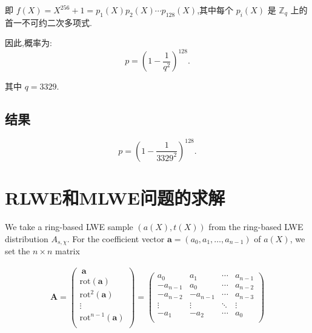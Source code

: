 \documentclass[12pt,a4paper]{article}
\numberwithin{equation}{section}
\begin{document}
即 $f(X) = X^{256} + 1 = p_1(X) p_2(X) \cdots p_{128}(X)$,其中每个 $p_i(X)$ 是 $\mathbb{Z}_q$ 上的首一不可约二次多项式.

因此,概率为:
\begin{equation}
	p = \left(1 - \frac{1}{q^2}\right)^{128}.
\end{equation}


其中 $q = 3329$.



\subsection{结果}

\begin{equation}
	p = \left(1 - \frac{1}{3329^2}\right)^{128}.
\end{equation}



\section{RLWE和MLWE问题的求解}

We take a ring-based LWE sample $(a(X), t(X))$ from the ring-based LWE distribution $A_{s,\chi}$. 
For the coefficient vector $\mathbf{a} = (a_0, a_1, \ldots , a_{n-1})$ of $a(X)$, we set the $n \times n$ matrix

\begin{align}
    \mathbf{A} = \left( \begin{matrix}
        \ \mathbf{a} \\ \mathrm{rot}(\mathbf{a}) \\ \mathrm{rot}^2(\mathbf{a}) \\ \vdots \\ \mathrm{rot}^{n-1}(\mathbf{a}) \\
    \end{matrix} \right) 
    = 
    \left( \begin{matrix}
        a_0 &a_1& \cdots& a_{n-1}\\ 
        -a_{n-1} &a_0& \cdots& a_{n-2}\\ 
        -a_{n-2} &-a_{n-1}& \cdots& a_{n-3}\\ 
        \vdots & \vdots & \ddots & \vdots\\ 
        -a_1 &-a_2& \cdots& a_{0}\\
    \end{matrix} \right)
\end{align}
\end{document}

